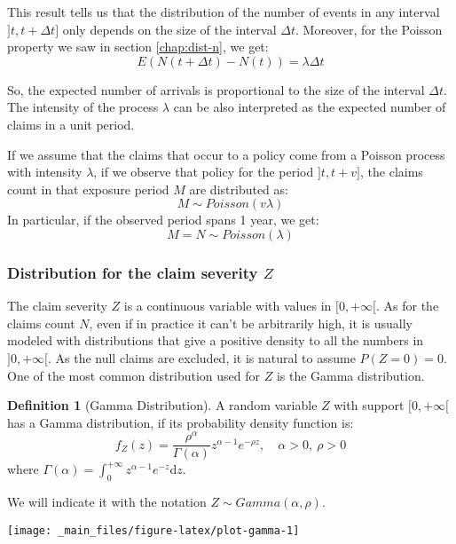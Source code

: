 \documentclass[a4paper, twoside, openright, 12pt]{report}
\let\origfigure\figure
\let\endorigfigure\endfigure
\renewenvironment{figure}[1][2] {
  \expandafter\origfigure\expandafter[!hbtp]
} {
  \endorigfigure
}
\theoremstyle{definition}
\newtheorem{definition}{Definition}[chapter]
\theoremstyle{definition}
\theoremstyle{definition}
\theoremstyle{remark}
\begin{document}
This result tells us that the distribution of the number of events in any interval \(]t, t+\Delta t]\) only depends on the size of the interval \(\Delta t\). Moreover, for the Poisson property we saw in section \ref{chap:dist-n}, we get:
\[E(N(t + \Delta t) - N(t)) = \lambda \Delta t\]

So, the expected number of arrivals is proportional to the size of the interval \(\Delta t\). The intensity of the process \(\lambda\) can be also interpreted as the expected number of claims in a unit period.

If we assume that the claims that occur to a policy come from a Poisson process with intensity \(\lambda\), if we observe that policy for the period \(]t, t+v]\), the claims count in that exposure period \(M\) are distributed as:
\[ M\sim Poisson(v \lambda) \]
In particular, if the observed period spans 1 year, we get:
\[ M = N \sim Poisson(\lambda) \]

\hypertarget{distribution-for-the-claim-severity-z}{%
\subsubsection{\texorpdfstring{Distribution for the claim severity \(Z\)}{Distribution for the claim severity Z}}\label{distribution-for-the-claim-severity-z}}

The claim severity \(Z\) is a continuous variable with values in \([0, +\infty[\). As for the claims count \(N\), even if in practice it can't be arbitrarily high, it is usually modeled with distributions that give a positive density to all the numbers in \(]0, +\infty[\). As the null claims are excluded, it is natural to assume \(P\left( Z=0 \right) = 0\). One of the most common distribution used for \(Z\) is the Gamma distribution.

\begin{definition}[Gamma Distribution]
\label{def:def-gamma} \iffalse (Gamma Distribution) \fi{} A random variable \(Z\) with support \([0, +\infty[\) has a Gamma distribution, if its probability density function is:
\[
f_Z(z) = \frac{\rho^\alpha}{\Gamma(\alpha)}z^{\alpha-1}e^{-\rho z}, \quad \alpha > 0, \ \rho > 0
\]
where \(\Gamma(\alpha) = \int_{0}^{+\infty}{z^{\alpha - 1} e^{-z} \mathrm{d} z}\).

We will indicate it with the notation \(Z \sim Gamma(\alpha, \rho)\).
\end{definition}

\begin{figure}[!hbtp]

{\centering \texttt{[image: \_main\_files/figure-latex/plot-gamma-1]} 

}

\caption{Gamma distribution for some values of $\alpha$ and $\rho$.}\label{fig:plot-gamma}
\end{figure}
\end{document}
